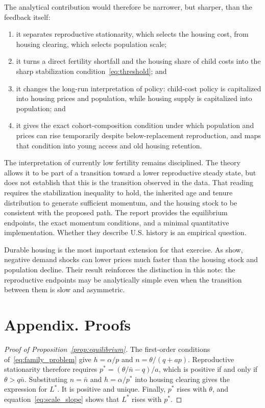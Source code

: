 \documentclass[11pt]{article}
\theoremstyle{definition}
\begin{document}
The analytical contribution would therefore be narrower, but sharper, than the
feedback itself:
\begin{enumerate}
 \item it separates reproductive stationarity, which selects the housing cost,
 from housing clearing, which selects population scale;
 \item it turns a direct fertility shortfall and the housing share of child
 costs into the sharp stabilization condition~\eqref{eq:threshold}; and
 \item it changes the long-run interpretation of policy: child-cost policy is
 capitalized into housing prices and population, while housing supply is
 capitalized into population; and
 \item it gives the exact cohort-composition condition under which population
 and prices can rise temporarily despite below-replacement reproduction, and
 maps that condition into young access and old housing retention.
\end{enumerate}

The interpretation of currently low fertility remains disciplined. The theory
allows it to be part of a transition toward a lower reproductive steady state,
but does not establish that this is the transition observed in the data. That
reading requires the stabilization inequality to hold, the inherited age and
tenure distribution to generate sufficient momentum, and the housing stock to
be consistent with the proposed path. The report provides the equilibrium
endpoints, the exact momentum conditions, and a minimal quantitative
implementation. Whether they describe U.S. history is an empirical question.

Durable housing is the most important extension for that exercise. As
\citet{glaeserGyourkoUrbanDecline2005} show, negative demand shocks can lower
prices much faster than the housing stock and population decline. Their result
reinforces the distinction in this note: the reproductive endpoints may be
analytically simple even when the transition between them is slow and
asymmetric.

\appendix
\section*{Appendix. Proofs}

\begin{proof}[Proof of Proposition~\ref{prop:equilibrium}]
The first-order conditions of~\eqref{eq:family_problem} give
$h=\alpha/p$ and $n=\theta/(q+ap)$. Reproductive stationarity therefore
requires $p^*=(\theta/\bar n-q)/a$, which is positive if and only if
$\theta>q\bar n$. Substituting $n=\bar n$ and $h=\alpha/p^*$ into housing
clearing gives the expression for $L^*$. It is positive and unique. Finally,
$p^*$ rises with $\theta$, and equation~\eqref{eq:scale_slope} shows that
$L^*$ rises with $p^*$.
\end{proof}
\end{document}
